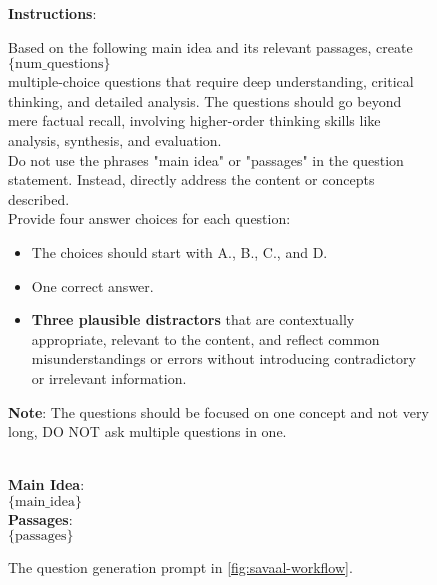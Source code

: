  \begin{figure}[h]
\centering
\begin{tcolorbox}[width=1\columnwidth, fontupper=\footnotesize,title= Savaal Question Generation Prompt]
\RaggedRight
\obeylines
\textbf{Instructions}: \\
{Based on the following main idea and its relevant passages, create $\{\text{num\_questions}\}$ \\ multiple-choice questions that require deep understanding, critical thinking, and detailed analysis. The questions should go beyond mere factual recall, involving higher-order thinking skills like analysis, synthesis, and evaluation. \\
Do not use the phrases "main idea" or "passages" in the question statement. Instead, directly address the content or concepts described. \\
Provide four answer choices for each question: \\
\begin{itemize}[label=-,nosep]
    \item The choices should start with A., B., C., and D.
    \item One correct answer.
    \item \textbf{Three plausible distractors} that are contextually appropriate, relevant to the content, and reflect common misunderstandings or errors without introducing contradictory or irrelevant information.
\end{itemize}

\vspace{3mm}
\textbf{Note}: The questions should be focused on one concept and not very long, DO NOT ask multiple questions in one.} \\
\vspace{3mm}
\vspace{3mm}
\textbf{Main Idea}: \\
$\{\text{main\_idea}\}$ \\
\vspace{3mm}
\textbf{Passages}: \\
$\{\text{passages}\}$ \\


\end{tcolorbox}
\centering
\caption{The question generation prompt in \autoref{fig:savaal-workflow}.}
\label{fig:question_generation}
\end{figure}


